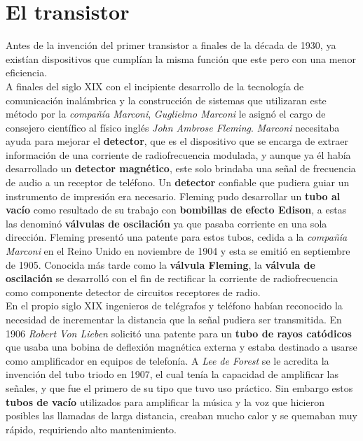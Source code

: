 \chapter{El transistor}\label{chapter:transistor}

Antes de la invención del primer transistor a finales de la década de 1930, ya existían dispositivos que cumplían la misma función que 
este pero con una menor eficiencia.\\
\indent A finales del siglo XIX con el incipiente desarrollo de la tecnología de comunicación inalámbrica y la construcción de sistemas que
utilizaran este método por la \emph{compañía Marconi}, \emph{Guglielmo Marconi} le asignó el cargo de consejero científico al físico
inglés \emph{John Ambrose Fleming}. \emph{Marconi} necesitaba ayuda para mejorar el \textbf{detector}, que es el
dispositivo que se encarga de extraer información de una corriente de radiofrecuencia modulada, y aunque ya él había desarrollado un
\textbf{detector magnético}, este solo brindaba una señal de frecuencia de audio a un receptor de teléfono. Un \textbf{detector}
confiable que pudiera guiar un instrumento de impresión era necesario. Fleming pudo desarrollar un \textbf{tubo al vacío} como resultado de su 
trabajo con \textbf{bombillas de efecto Edison}, a estas las denominó \textbf{válvulas de oscilación} ya que pasaba corriente en una sola
dirección. Fleming presentó una patente para estos tubos, cedida a la \emph{compañía Marconi} en el Reino Unido en noviembre de 1904 y esta
se emitió en septiembre de 1905. Conocida más tarde como la \textbf{válvula Fleming}, la \textbf{válvula de oscilación} se desarrolló con el
fin de rectificar la corriente de radiofrecuencia como componente detector de circuitos receptores de radio. \\
\indent En el propio siglo XIX ingenieros de telégrafos y teléfono habían reconocido la necesidad de incrementar la distancia que la señal pudiera ser
transmitida. En 1906 \emph{Robert Von Lieben} solicitó una patente para un \textbf{tubo de rayos catódicos} que usaba una bobina de deflexión
magnética externa y estaba destinado a usarse como amplificador en equipos de telefonía. A \emph{Lee de Forest} se le acredita la invención del
tubo triodo en 1907, el cual tenía la capacidad de amplificar las señales, y que fue el primero de su tipo que tuvo uso práctico. Sin embargo estos
\textbf{tubos de vacío} utilizados para amplificar la música y la voz que hicieron posibles las llamadas de larga distancia, creaban mucho calor y
se quemaban muy rápido, requiriendo alto mantenimiento. \\

